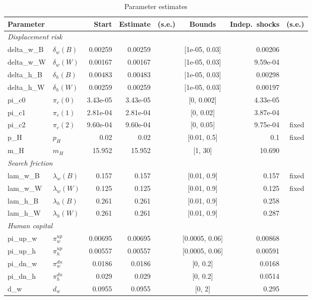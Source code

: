\begin{table}[htbp]\centering\footnotesize
\caption{Parameter estimates}\label{tab:params_estimates}
\begin{tabular}{llrrrcrr}
\toprule
Parameter & & Start & Estimate & (s.e.) & Bounds & Indep.\ shocks & (s.e.) \\
\midrule
\multicolumn{8}{l}{\textit{Displacement risk}} \\
delta\_w\_B & $\delta_w(B)$ & 0.00259 & 0.00259 &  & [1e-05, 0.03] & 0.00206 &  \\
delta\_w\_W & $\delta_w(W)$ & 0.00167 & 0.00167 &  & [1e-05, 0.03] & 9.59e-04 &  \\
delta\_h\_B & $\delta_h(B)$ & 0.00483 & 0.00483 &  & [1e-05, 0.03] & 0.00298 &  \\
delta\_h\_W & $\delta_h(W)$ & 0.00259 & 0.00259 &  & [1e-05, 0.03] & 0.00197 &  \\
pi\_c0 & $\pi_c(0)$ & 3.43e-05 & 3.43e-05 &  & [0, 0.002] & 4.33e-05 &  \\
pi\_c1 & $\pi_c(1)$ & 2.81e-04 & 2.81e-04 &  & [0, 0.02] & 3.87e-04 &  \\
pi\_c2 & $\pi_c(2)$ & 9.60e-04 & 9.60e-04 &  & [0, 0.05] & 9.75e-04 & fixed \\
p\_H & $p_H$ & 0.02 & 0.02 &  & [0.01, 0.5] & 0.1 & fixed \\
m\_H & $m_H$ & 15.952 & 15.952 &  & [1, 30] & 10.690 &  \\
\multicolumn{8}{l}{\textit{Search friction}} \\
lam\_w\_B & $\lambda_w(B)$ & 0.157 & 0.157 &  & [0.01, 0.9] & 0.157 & fixed \\
lam\_w\_W & $\lambda_w(W)$ & 0.125 & 0.125 &  & [0.01, 0.9] & 0.125 & fixed \\
lam\_h\_B & $\lambda_h(B)$ & 0.261 & 0.261 &  & [0.01, 0.9] & 0.258 &  \\
lam\_h\_W & $\lambda_h(W)$ & 0.261 & 0.261 &  & [0.01, 0.9] & 0.287 &  \\
\multicolumn{8}{l}{\textit{Human capital}} \\
pi\_up\_w & $\pi^{up}_w$ & 0.00695 & 0.00695 &  & [0.0005, 0.06] & 0.00868 &  \\
pi\_up\_h & $\pi^{up}_h$ & 0.00557 & 0.00557 &  & [0.0005, 0.06] & 0.00591 &  \\
pi\_dn\_w & $\pi^{dn}_w$ & 0.0186 & 0.0186 &  & [0, 0.2] & 0.0168 &  \\
pi\_dn\_h & $\pi^{dn}_h$ & 0.029 & 0.029 &  & [0, 0.2] & 0.0514 &  \\
d\_w & $d_w$ & 0.0955 & 0.0955 &  & [0, 2] & 0.295 &  \\

\end{tabular}
\end{table}
